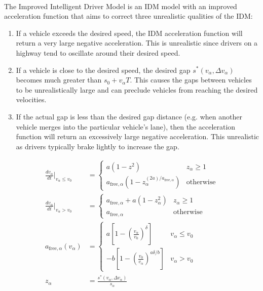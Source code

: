 \documentclass[12pt]{article}
\begin{document}
\paragraph{}
The Improved Intelligent Driver Model is an IDM model with an improved acceleration function that aims to correct three unrealistic qualities of the IDM:
\begin{enumerate}
  \item 
  If a vehicle exceeds the desired speed, the IDM acceleration function will return a very large negative acceleration.  This is unrealistic since drivers on a highway tend to oscillate around their desired speed.  
  \item
  If a vehicle is close to the desired speed, the desired gap $s^*(v_\alpha,\Delta v_\alpha)$ becomes much greater than $s_0 + v_\alpha T$.  This causes the gaps between vehicles to be unrealistically large and can preclude vehicles from reaching the desired velocities.
  \item
  If the actual gap is less than the desired gap distance (e.g. when another vehicle merges into the particular vehicle's lane), then the acceleration function will return an excessively large negative acceleration.  This unrealistic as drivers typically brake lightly to increase the gap.
\end{enumerate}
\begin{mymathbox}[ams gather, title=IIDM Governing Functions, colframe=blue!30!black]
  \begin{align}
  \frac{dv_\alpha}{dt}\Bigr|_{v_\alpha\le v_0}&= 
  \begin{cases}
    a (1-z^2) & z_\alpha \ge 1\\
   a_{\text{free},\alpha}(1 - z_\alpha^{(2a)/a_{\text{free},\alpha}})& \text{otherwise}
  \end{cases}
  \\
  \frac{dv_\alpha}{dt}\Bigr|_{v_\alpha> v_0}&= 
  \begin{cases}
    a_{\text{free},\alpha} + a (1-z_\alpha^2) & z_\alpha \ge 1\\
    a_{\text{free},\alpha} & \text{otherwise}
  \end{cases}\\
  a_{\text{free},\alpha}(v_\alpha)&= \begin{cases}
  a \left[ 1 - (\frac{v_\alpha}{v_0})^\delta \right] & v_\alpha \le v_0\\
  -b \left[ 1 - (\frac{v_0}{v_\alpha})^{a\delta/b} \right] & v_\alpha > v_0
  \end{cases}\\
  z_\alpha&= \frac{s^*(v_\alpha, \Delta v_\alpha)}{s_\alpha}
  \end{align}
\end{mymathbox}
\end{document}
